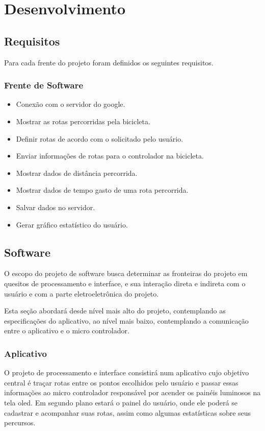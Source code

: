 \chapter{Desenvolvimento}
  \section{Requisitos}
	Para cada frente do projeto foram definidos os seguintes requisitos.
	\subsection{Frente de Software}
	\begin{itemize}
		\item Conexão com o servidor do google.
		\item Mostrar as rotas percorridas pela bicicleta.
		\item Definir rotas de acordo com o solicitado pelo usuário.
		\item Enviar informações de rotas para o controlador na bicicleta.
		\item Mostrar dados de distância percorrida.
		\item Mostrar dados de tempo gasto de uma rota percorrida.
		\item Salvar dados no servidor.
		\item Gerar gráfico estatístico do usuário.
	\end{itemize}
 
  \section{Software}
  O escopo do projeto de software busca determinar as fronteiras do projeto em quesitos de processamento e interface, e sua interação direta e indireta com o usuário e com a parte eletroeletrônica do projeto.

Esta seção abordará desde nível mais alto do projeto, contemplando as especificações do aplicativo, ao nível mais baixo, contemplando a comunicação entre o aplicativo e o micro controlador.

	\subsection{Aplicativo}
O projeto de processamento e interface consistirá num aplicativo cujo objetivo central é traçar rotas entre os pontos escolhidos pelo usuário e passar essas informações ao micro controlador responsável por acender os painéis luminosos na tela oled. 
Em segundo plano estará o painel do usuário, onde ele poderá se cadastrar e acompanhar suas rotas, assim como algumas estatísticas sobre seus percursos.

